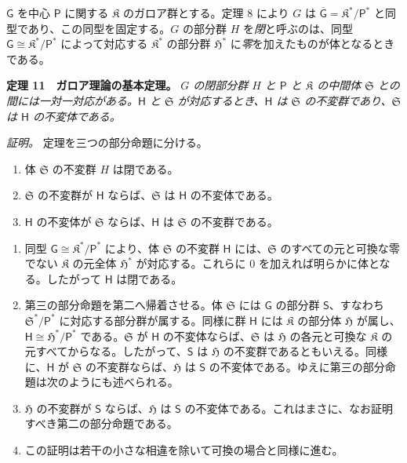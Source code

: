 $\mathsf{G}$ を中心 $\mathsf P$ に関する $\mathfrak K$ のガロア群とする。定理 8 により $G$ は $\overline{\mathsf G}=\mathfrak K^*/\mathsf P^*$ と同型であり、この同型を固定する。$G$ の部分群 $H$ を\emph{閉}と呼ぶのは、同型 $\mathsf{G}\cong\mathfrak K^*/\mathsf P^*$ によって対応する $\mathfrak K^*$ の部分群 $\mathfrak H^*$ に\emph{零}を加えたものが体となるときである。

\textbf{定理 11　ガロア理論の基本定理。} \emph{$G$ の閉部分群 $H$ と $\mathsf P$ と $\mathfrak K$ の中間体 $\mathfrak S$ との間には一対一対応がある。$\mathsf{H}$ と $\mathfrak S$ が対応するとき、$\mathsf{H}$ は $\mathfrak S$ の不変群であり、$\mathfrak S$ は $\mathsf{H}$ の不変体である。}

\emph{証明。} 定理を三つの部分命題に分ける。
\begin{enumerate}
\item 体 $\mathfrak S$ の不変群 $H$ は閉である。
\item $\mathfrak S$ の不変群が $\mathsf{H}$ ならば、$\mathfrak S$ は $\mathsf{H}$ の不変体である。
\item $\mathsf{H}$ の不変体が $\mathfrak S$ ならば、$\mathsf{H}$ は $\mathfrak S$ の不変群である。
\end{enumerate}

\begin{enumerate}
\item 同型 $\mathsf{G}\cong \mathfrak K^*/\mathsf P^*$ により、体 $\mathfrak S$ の不変群 $\mathsf{H}$ には、$\mathfrak S$ のすべての元と可換な零でない $\mathfrak K$ の元全体 $\mathfrak H^*$ が対応する。これらに $0$ を加えれば明らかに体となる。したがって $\mathsf{H}$ は閉である。

\item 第三の部分命題を第二へ帰着させる。体 $\mathfrak S$ には $\mathsf{G}$ の部分群 $\mathsf{S}$、すなわち $\mathfrak S^*/\mathsf P^*$ に対応する部分群が属する。同様に群 $\mathsf{H}$ には $\mathfrak K$ の部分体 $\mathfrak H$ が属し、$\mathsf{H}\cong \mathfrak H^*/\mathsf P^*$ である。$\mathfrak S$ が $\mathsf{H}$ の不変体ならば、$\mathfrak S$ は $\mathfrak H$ の各元と可換な $\mathfrak K$ の元すべてからなる。したがって、$\mathsf{S}$ は $\mathfrak H$ の不変群であるともいえる。同様に、$\mathsf{H}$ が $\mathfrak S$ の不変群ならば、$\mathfrak H$ は $\mathsf{S}$ の不変体である。ゆえに第三の部分命題は次のようにも述べられる。

\item[$3'$.] $\mathfrak H$ の不変群が $\mathsf{S}$ ならば、$\mathfrak H$ は $\mathsf{S}$ の不変体である。これはまさに、なお証明すべき第二の部分命題である。

\item[3.] この証明は若干の小さな相違を除いて可換の場合と同様に進む。
\end{enumerate}

